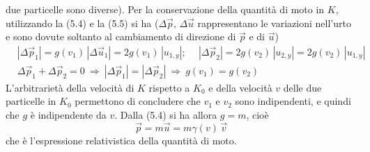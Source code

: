 due particelle sono diverse). Per la conservazione della quantit\`a di moto in
$K$, utilizzando la (5.4) e la (5.5) si ha ($\Delta\vec p$, $\Delta\vec u$
rappresentano le variazioni nell'urto e sono dovute soltanto al cambiamento di
direzione di $\vec p$ e di $\vec u$)
\begin{equation}
  \begin{aligned}
    &|\Delta\vec p_1|=g(v_1)\,|\Delta\vec u_1|=2g(v_1)\,|u_{1,y}|;
    \quad\ |\Delta\vec p_2|=2g(v_2)\,|u_{2,y}|=2g(v_2)\,|u_{1,y}|\\
    &\Delta\vec p_1+\Delta\vec p_2=0\ \Rightarrow
    \ |\Delta\vec p_1|=|\Delta\vec p_2|\ \Rightarrow\ g(v_1)=g(v_2)
  \end{aligned}
  \tag{5.6}
\end{equation}
L'arbitrariet\`a della velocit\`a di $K$ rispetto a $K_0$ e della velocit\`a $v$
delle due particelle in $K_0$ permettono di concludere che $v_1$ e $v_2$ sono
indipendenti, e quindi che $g$ \`e indipendente da $v$. Dalla (5.4) si ha allora
$g=m$, cio\`e
\begin{equation}
  \vec p=m\vec u=m\gamma(v)\,\vec v
  \tag{5.7}
\end{equation}
che \`e l'espressione relativistica della quantit\`a di moto.

